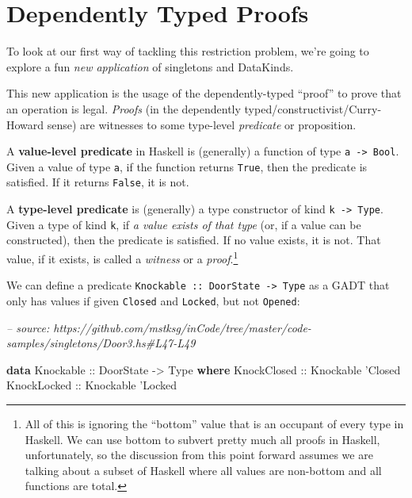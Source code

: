 \documentclass[]{article}
\newenvironment{Shaded}{}{}
\newcommand{\CommentTok}[1]{\textcolor[rgb]{0.38,0.63,0.69}{\textit{#1}}}
\newcommand{\DataTypeTok}[1]{\textcolor[rgb]{0.56,0.13,0.00}{#1}}
\newcommand{\KeywordTok}[1]{\textcolor[rgb]{0.00,0.44,0.13}{\textbf{#1}}}
\newcommand{\NormalTok}[1]{#1}
\newcommand{\OtherTok}[1]{\textcolor[rgb]{0.00,0.44,0.13}{#1}}
\begin{document}
\hypertarget{dependently-typed-proofs}{%
\section{Dependently Typed Proofs}\label{dependently-typed-proofs}}

To look at our first way of tackling this restriction problem, we're going to
explore a fun \emph{new application} of singletons and DataKinds.

This new application is the usage of the dependently-typed ``proof'' to prove
that an operation is legal. \emph{Proofs} (in the dependently
typed/constructivist/Curry-Howard sense) are witnesses to some type-level
\emph{predicate} or proposition.

A \textbf{value-level predicate} in Haskell is (generally) a function of type
\texttt{a\ -\textgreater{}\ Bool}. Given a value of type \texttt{a}, if the
function returns \texttt{True}, then the predicate is satisfied. If it returns
\texttt{False}, it is not.

A \textbf{type-level predicate} is (generally) a type constructor of kind
\texttt{k\ -\textgreater{}\ Type}. Given a type of kind \texttt{k}, if \emph{a
value exists of that type} (or, if a value can be constructed), then the
predicate is satisfied. If no value exists, it is not. That value, if it exists,
is called a \emph{witness} or a \emph{proof}.\footnote{All of this is ignoring
  the ``bottom'' value that is an occupant of every type in Haskell. We can use
  bottom to subvert pretty much all proofs in Haskell, unfortunately, so the
  discussion from this point forward assumes we are talking about a subset of
  Haskell where all values are non-bottom and all functions are total.}

We can define a predicate
\texttt{Knockable\ ::\ DoorState\ -\textgreater{}\ Type} as a GADT that only has
values if given \texttt{\textquotesingle{}Closed} and
\texttt{\textquotesingle{}Locked}, but not \texttt{\textquotesingle{}Opened}:

\begin{Shaded}
\begin{Highlighting}[]
\CommentTok{-- source: https://github.com/mstksg/inCode/tree/master/code-samples/singletons/Door3.hs#L47-L49}

\KeywordTok{data} \DataTypeTok{Knockable}\OtherTok{ ::} \DataTypeTok{DoorState} \OtherTok{->} \DataTypeTok{Type} \KeywordTok{where}
    \DataTypeTok{KnockClosed}\OtherTok{ ::} \DataTypeTok{Knockable}\NormalTok{ '}\DataTypeTok{Closed}
    \DataTypeTok{KnockLocked}\OtherTok{ ::} \DataTypeTok{Knockable}\NormalTok{ '}\DataTypeTok{Locked}
\end{Highlighting}
\end{Shaded}
\end{document}
